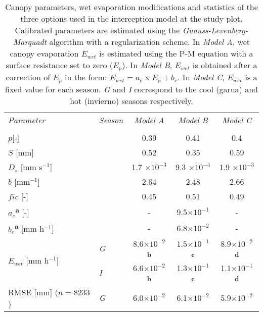 \documentclass[a4paper,12pt]{article}
\begin{document}
\begin{table}[H]
           \caption{Canopy parameters, wet evaporation modifications and statistics of the three options used in the interception model at the study plot. Calibrated parameters are estimated using the \emph{Guauss-Levenberg-Marquadt} algorithm with a regularization scheme. In \textit{Model A}, wet canopy evaporation $E_{wet}$ is estimated using the P-M equation with a surface resistance set to zero ($E_p$). In \textit{Model B}, $E_{wet}$ is obtained after a correction of $E_p$ in the form: $E_{wet}=a_e \times E_p + b_e$. In \textit{Model C}, $E_{wet}$ is a fixed value for each season. \textit{G} and \textit{I} correspond to the cool (garua) and hot (invierno) seasons respectively.} \label{tb:fog_param}
           \centering
           \footnotesize
            \colorbox{gray!15} {
\centering
            \begin{tabular}{llccc}
            \textit{Parameter}&\textit{Season}&\textit{Model A}&\textit{Model B}&\textit{Model C}\\ 
            \hhline{-----} \\[-8pt]
			$p$[-] &&0.39&0.41&0.4\\
			$S$ [mm]&&0.52&0.35&0.59\\
			$D_s$ [mm s$^{-1}$]&&1.7 $\times 10^{-3}$&9.3 $\times 10^{-4}$&1.9 $\times 10^{-3}$\\
			$b$ [mm$^{-1}$]&&2.64&2.48&2.66\\
			$fic$ [-]&&0.45&0.51&0.49\\
			[8pt]
			$a_e$\textsuperscript{\textcolor{Blue4}{\bf {\tiny{a}}}} [-]&&-&9.5$\times 10^{-1}$&-\\
			$b_e$\textsuperscript{\textcolor{Blue4}{\bf {\tiny{a}}}} [mm h$^{-1}$]&&-&6.8$\times 10^{-2}$&-\\
			[8pt]
			\multirow{2}{*}{$E_{wet}$ [mm h$^{-1}$]}&\textit{G}&8.6$\times 10^{-2}$\textsuperscript{\textcolor{Blue4}{\bf {\tiny{b}}}}&1.5$\times 10^{-1}$\textsuperscript{\textcolor{Blue4}{\bf {\tiny{c}}}}&8.9$\times 10^{-2}$\textsuperscript{\textcolor{Blue4}{\bf {\tiny{d}}}} \\			
			&\textit{I}&6.6$\times 10^{-2}$\textsuperscript{\textcolor{Blue4}{\bf {\tiny{b}}}}&1.3$\times 10^{-1}$\textsuperscript{\textcolor{Blue4}{\bf {\tiny{c}}}}&1.1$\times 10^{-1}$\textsuperscript{\textcolor{Blue4}{\bf {\tiny{d}}}} \\			
			[8pt]
			\multirow{2}{*}{RMSE [mm] ($n=8233$)}&\textit{G}&6.0$\times 10^{-2}$&6.1$\times 10^{-2}$&5.9$\times 10^{-2}$\\

\end{tabular}}
\end{table}
\end{document}
